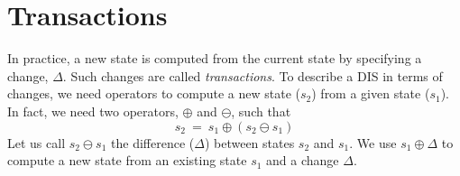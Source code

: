 \documentclass{elsarticle}
\begin{document}
\section{Transactions}
\label{sct:Transactions}
	In practice, a new state is computed from the current state by specifying a change, $\Delta$.
	Such changes are called {\em transactions}.
	To describe a DIS in terms of changes, we need operators to compute a new state ($s_2$) from a given state ($s_1$).
	In fact, we need two operators, $\oplus$ and $\ominus$, such that
\begin{equation}
	s_2\ =\ s_1\oplus(s_2\ominus s_1)
\label{req:oplus and ominus}
\end{equation}
	Let us call $s_2\ominus s_1$ the difference ($\Delta$) between states $s_2$ and $s_1$.
	We use $s_1\oplus\Delta$ to compute a new state from an existing state $s_1$ and a change $\Delta$.
\end{document}
